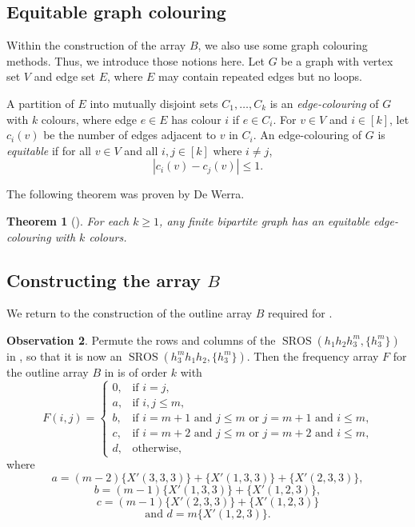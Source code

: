 \documentclass[preprint,nonatbib]{elsarticle}
\DeclareMathOperator{\SROS}{SROS}
\newtheorem{theorem}{Theorem}[section]
\theoremstyle{definition}
\newtheorem{observation}[theorem]{Observation}
\numberwithin{equation}{section}
\begin{document}
\subsection{Equitable graph colouring}

Within the construction of the array $B$, we also use some graph colouring methods. Thus, we introduce those notions here. Let $G$ be a graph with vertex set $V$ and edge set $E$, where $E$ may contain repeated edges but no loops.

A partition of $E$ into mutually disjoint sets $C_1,\dots, C_k$ is an \emph{edge-colouring} of $G$ with $k$ colours, where edge $e\in E$ has colour $i$ if $e\in C_i$. For $v\in V$ and $i\in[k]$, let $c_i(v)$ be the number of edges adjacent to $v$ in $C_i$. An edge-colouring of $G$ is \emph{equitable} if for all $v\in V$ and all $i,j\in[k]$ where $i\neq j$,
$$|c_i(v)-c_j(v)|\leq 1.$$

The following theorem was proven by De Werra.

\begin{theorem}[\cite{de1971balanced}]
\label{thm: de werra}
    For each $k\geq 1$, any finite bipartite graph has an equitable edge-colouring with $k$ colours.
\end{theorem}


\subsection{Constructing the array $B$}

We return to the construction of the outline array $B$ required for .

\begin{observation}
\label{lemma: freq array for h_1h_2h_3^m}
Permute the rows and columns of the $\SROS(h_1h_2h_3^m,\{h_3^m\})$ in , so that it is now an $\SROS(h_3^mh_1h_2,\{h_3^m\})$. Then the frequency array $F$ for the outline array $B$ in  is of order $k$ with
$$F(i,j) = \begin{cases}
    0, & \text{if $i=j$,}\\
    a, & \text{if $i,j\leq m$,}\\
    b, & \text{if $i=m+1$ and $j\leq m$ or $j=m+1$ and $i\leq m$,}\\
    c, & \text{if $i=m+2$ and $j\leq m$ or $j=m+2$ and $i\leq m$,}\\
    d, & \text{otherwise,}
\end{cases}$$
where $$a = (m-2)\{X'(3,3,3)\} + \{X'(1,3,3)\} + \{X'(2,3,3)\},$$ $$b = (m-1)\{X'(1,3,3)\} + \{X'(1,2,3)\},$$ $$c = (m-1)\{X'(2,3,3)\} + \{X'(1,2,3)\}$$ $$\text{and } d = m\{X'(1,2,3)\}.$$
\end{observation}
\end{document}
